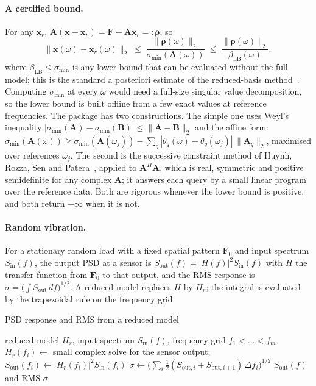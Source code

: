\paragraph{A certified bound.}
For any $\bm x_r$, $\bm A(\bm x-\bm x_r)=\bm F-\bm A\bm x_r=:\bm\rho$, so
\begin{equation}\label{eq:fr-bound}
\|\bm x(\omega)-\bm x_r(\omega)\|_2\;\le\;\frac{\|\bm\rho(\omega)\|_2}{\sigma_{\min}(\bm A(\omega))}\;\le\;\frac{\|\bm\rho(\omega)\|_2}{\beta_{\mathrm{LB}}(\omega)},
\end{equation}
where $\beta_{\mathrm{LB}}\le\sigma_{\min}$ is any lower bound that can be evaluated without the full model; this is the standard a posteriori estimate of the reduced-basis method~\cite{hesthaven2016rb}. Computing $\sigma_{\min}$ at every $\omega$ would need a full-size singular value decomposition, so the lower bound is built offline from a few exact values at reference frequencies. The package has two constructions. The simple one uses Weyl's inequality $|\sigma_{\min}(\bm A)-\sigma_{\min}(\bm B)|\le\|\bm A-\bm B\|_2$ and the affine form: $\sigma_{\min}(\bm A(\omega))\ge\sigma_{\min}(\bm A(\omega_j))-\sum_q|\theta_q(\omega)-\theta_q(\omega_j)|\,\|\bm A_q\|_2$, maximised over references $\omega_j$. The second is the successive constraint method of Huynh, Rozza, Sen and Patera~\cite{huynh2007scm}, applied to $\bm A^H\bm A$, which is real, symmetric and positive semidefinite for any complex $\bm A$; it answers each query by a small linear program over the reference data. Both are rigorous whenever the lower bound is positive, and both return $+\infty$ when it is not.

\paragraph{Random vibration.}
For a stationary random load with a fixed spatial pattern $\bm F_0$ and input spectrum $S_{\mathrm{in}}(f)$, the output PSD at a sensor is $S_{\mathrm{out}}(f)=|H(f)|^2S_{\mathrm{in}}(f)$ with $H$ the transfer function from $\bm F_0$ to that output, and the RMS response is $\sigma=\bigl(\int S_{\mathrm{out}}\,df\bigr)^{1/2}$. A reduced model replaces $H$ by $H_r$; the integral is evaluated by the trapezoidal rule on the frequency grid.

\begin{algbox}{PSD response and RMS from a reduced model}
\begin{pseudo}
\Require reduced model $H_r$, input spectrum $S_{\mathrm{in}}(f)$, frequency grid $f_1<\dots<f_m$
  \State $H_r(f_i)\gets$ small complex solve for the sensor output;\ $S_{\mathrm{out}}(f_i)\gets|H_r(f_i)|^2S_{\mathrm{in}}(f_i)$
\EndFor
\State $\sigma\gets\big(\sum_i\tfrac12(S_{\mathrm{out},i}+S_{\mathrm{out},i+1})\,\Delta f_i\big)^{1/2}$ 
\Ensure $S_{\mathrm{out}}(f)$ and RMS $\sigma$
\end{pseudo}
\end{algbox}

